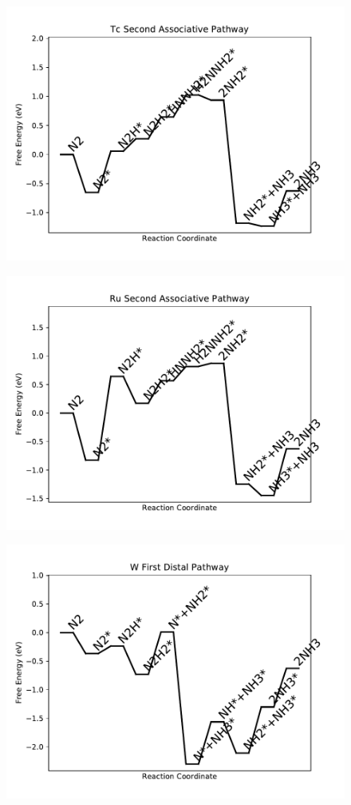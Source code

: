 \begin{figure}
\includegraphics[width=0.8\linewidth]{data/plots/Tc_associative_2.pdf}
\end{figure}

\begin{figure}
\includegraphics[width=0.8\linewidth]{data/plots/Ru_associative_2.pdf}
\end{figure}

\begin{figure}
\includegraphics[width=0.8\linewidth]{data/plots/W_distal_1.pdf}
\end{figure}

